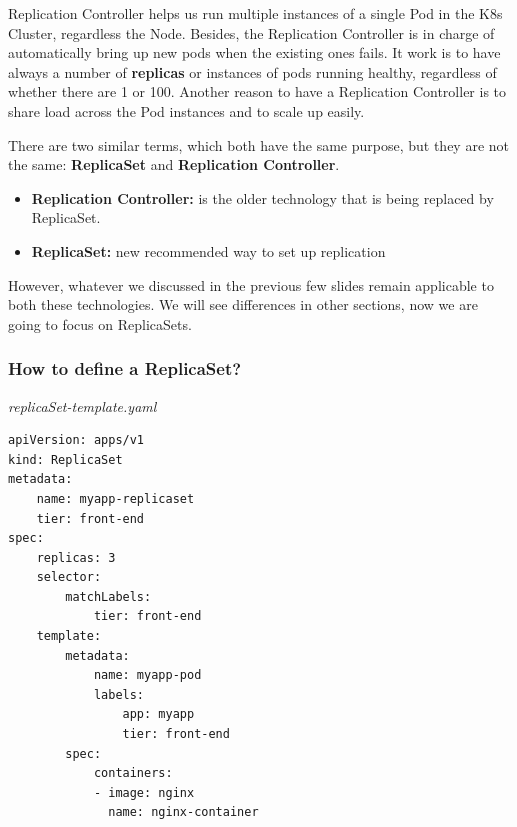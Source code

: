 \documentclass{article}
\newenvironment{blocktemplateIII}[1]{%
    \tcolorbox[beamer,%
    noparskip,breakable,
    ,colframe=Red,%
    colbacklower=LimeGreen!75!LightGreen,%
    title=#1]}%
    {\endtcolorbox}
\newenvironment{codetemplate}[1][]{%
  \mybasecolorbox[#1]
  \itshape
}{%
  \endmybasecolorbox
}
\begin{document}
Replication Controller helps us run multiple instances of a single Pod in the K8s Cluster, regardless the Node. Besides, the Replication Controller is in charge of automatically bring up new pods when the existing ones fails. It work is to have always a number of \textbf{replicas} or instances of pods running healthy, regardless of whether there are 1 or 100. Another reason to have a Replication Controller is to share load across the Pod instances and to scale up easily.

\begin{blocktemplateIII}{Note}
There are two similar terms, which both have the same purpose, but they are not the same: \textbf{ReplicaSet} and \textbf{Replication Controller}.

\begin{itemize}
    \item \textbf{Replication Controller:} is the older technology that is being replaced by ReplicaSet.
    \item \textbf{ReplicaSet:} new recommended way to set up replication
\end{itemize}

However, whatever we discussed in the previous few slides remain applicable to both these technologies. We will see differences in other sections, now we are going to focus on ReplicaSets.
\end{blocktemplateIII}

\subsubsection{How to define a ReplicaSet?}

\begin{codetemplate}{replicaSet-template.yaml}
\begin{verbatim}
apiVersion: apps/v1
kind: ReplicaSet
metadata:
    name: myapp-replicaset
    tier: front-end
spec:
    replicas: 3
    selector:
        matchLabels:
            tier: front-end
    template:
        metadata:
            name: myapp-pod
            labels: 
                app: myapp
                tier: front-end
        spec:
            containers:
            - image: nginx
              name: nginx-container
\end{verbatim}
\end{codetemplate}
\end{document}
